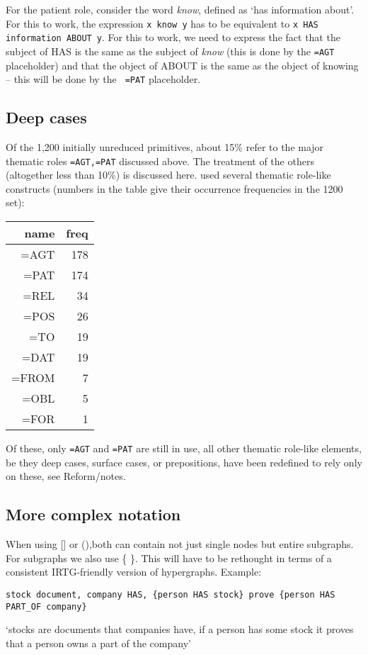 \documentclass[11pt,bookmarks,bookmarksnumbered,naturalnames,plainpages=false,pdftex,colorlinks=true,urlcolor=blue,bookmarksdepth=subsection,plainpages=false]{paper}
\begin{document}
For the patient role, consider the word {\it know}, defined as `has
information about'. For this to work, the expression {\tt x know y} has to be
equivalent to {\tt x HAS information ABOUT y}. For this to work, we need to
express the fact that the subject of HAS is the same as the subject of {\it
  know} (this is done by the {\tt =AGT} placeholder) and that the object of
ABOUT is the same as the object of knowing -- this will be done by the {\tt
  =PAT} placeholder. 

\subsection{Deep cases}\label{deepcase}

Of the 1,200 initially unreduced primitives, about 15\% refer to the major
thematic roles {\tt =AGT,=PAT} discussed above. The treatment of the others
(altogether less than 10\%) is discussed here. \cite{Makrai:2014} used several 
thematic role-like constructs (numbers in the table give their occurrence
frequencies in the 1200 set):

\begin{tabular}{rr}
name & freq\\
\hline
=AGT & 178\\
=PAT & 174\\
=REL & 34\\
=POS & 26\\
=TO & 19\\
=DAT & 19\\
=FROM & 7\\
=OBL & 5\\
=FOR & 1\\
\end{tabular}

Of these, only {\tt =AGT} and {\tt =PAT} are still in use, all other thematic
role-like elements, be they deep cases, surface cases, or prepositions, have
been redefined to rely only on these, see Reform/notes.

\subsection{More complex notation}\label{parens}

When using [] or (),both can contain not just single nodes but entire
subgraphs. For subgraphs we also use \{ \}. This will have to be rethought in terms of a consistent
IRTG-friendly version of hypergraphs. Example:

\begin{verbatim}
stock document, company HAS, {person HAS stock} prove {person HAS PART_OF company}
\end{verbatim}

`stocks are documents that companies have, if a person has some stock it
proves that a person owns a part of the company'


\printbibliography
\end{document}
